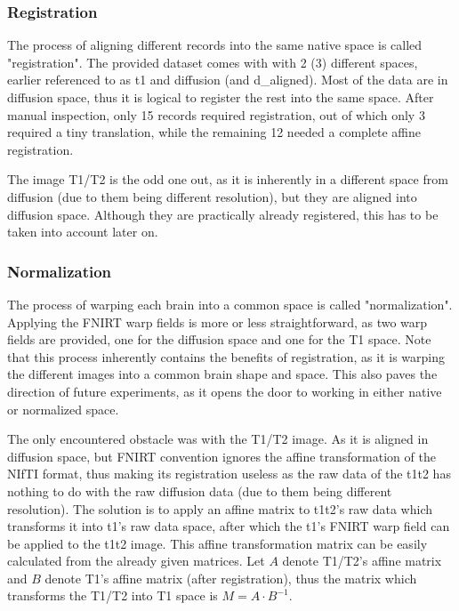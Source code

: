 \subsubsection{Registration}
The process of aligning different records into the same native space is called "registration". The provided dataset comes with with 2 (3) different spaces, earlier referenced to as t1 and diffusion (and d\_aligned). Most of the data are in diffusion space, thus it is logical to register the rest into the same space. After manual inspection, only 15 records required registration, out of which only 3 required a tiny translation, while the remaining 12 needed a complete affine registration.\par

The image T1/T2 is the odd one out, as it is inherently in a different space from diffusion (due to them being different resolution), but they are aligned into diffusion space. Although they are practically already registered, this has to be taken into account later on.

\subsubsection{Normalization}
The process of warping each brain into a common space is called "normalization". Applying the \ac{FNIRT} warp fields is more or less straightforward, as two warp fields are provided, one for the diffusion space and one for the T1 space. Note that this process inherently contains the benefits of registration, as it is warping the different images into a common brain shape and space. This also paves the direction of future experiments, as it opens the door to working in either native or normalized space.\par

The only encountered obstacle was with the T1/T2 image. As it is aligned in diffusion space, but \ac{FNIRT} convention ignores the affine transformation of the \ac{NIfTI} format, thus making its registration useless as the raw data of the t1t2 has nothing to do with the raw diffusion data (due to them being different resolution). The solution is to apply an affine matrix to t1t2's raw data which transforms it into t1's raw data space, after which the t1's \ac{FNIRT} warp field can be applied to the t1t2 image. This affine transformation matrix can be easily calculated from the already given matrices. Let $A$ denote T1/T2's affine matrix and $B$ denote T1's affine matrix (after registration), thus the matrix which transforms the T1/T2 into T1 space is $M = A \cdot B^{-1}$.

